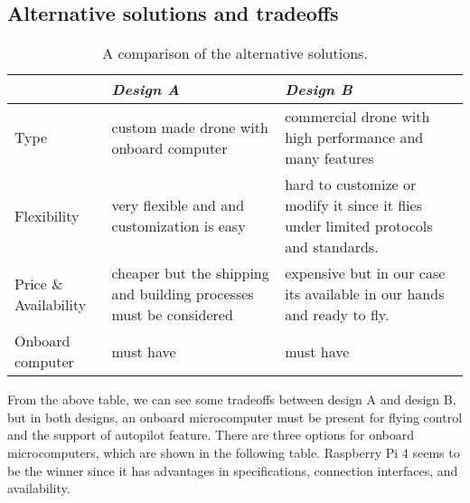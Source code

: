\documentclass[../main.tex]{subfiles}
\begin{document}
\subsection{Alternative solutions and tradeoffs}
\begin{table}[H]
        \centering
	\caption{A comparison of the alternative solutions.}
        \label{tab:alt-solutions}
	\begin{tabular}{ p{4cm} p{6cm} p{6cm} }
		\toprule
		\textit{} & \textit{Design A} & \textit{Design B}\\ \midrule
		Type  & custom made drone with onboard computer & commercial drone with high performance and many features    \\
		Flexibility & very flexible and and customization is easy & hard to customize or modify it since it flies under limited protocols and standards. \\
		
		Price \& Availability & cheaper but the shipping and building processes must be considered & expensive but in our case its available in our hands and ready to fly.   \\
		
		Onboard computer & must have & must have \\
                \bottomrule
	\end{tabular}
\end{table} 
From the above table, we can see some tradeoffs between design A and design B, but in both designs, an onboard microcomputer must be present for flying control and the support of autopilot feature. There are three options for onboard microcomputers, which are shown in the following table. Raspberry Pi 4 seems to be the winner since it has advantages in specifications, connection interfaces, and availability.
\end{document}

